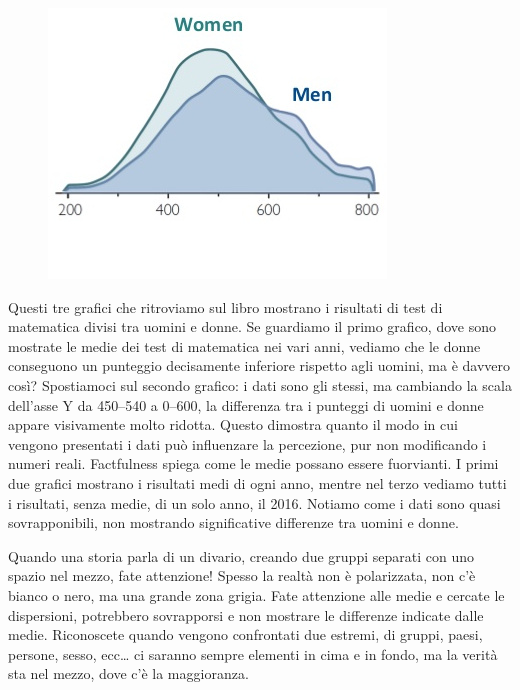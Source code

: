 \documentclass[12pt]{book} %
\begin{document}
\begin{figure}[H]
\begin{minipage}{0.3\textwidth}
    \end{minipage}
    \hfill
    \begin{minipage}{0.3\textwidth}
        \centering
        \includegraphics[width=\linewidth]{images/Libro-img004.jpg}
    \end{minipage}
\end{figure}

Questi tre grafici che ritroviamo sul libro mostrano i risultati di test di matematica divisi tra uomini e donne. Se
guardiamo il primo grafico, dove sono mostrate le medie dei test di matematica nei vari anni, vediamo che le donne
conseguono un punteggio decisamente inferiore rispetto agli uomini, ma è davvero così? Spostiamoci sul secondo grafico: i dati sono gli stessi, ma cambiando la scala dell’asse Y da 450–540 a 0–600, la differenza tra i punteggi di uomini e donne appare visivamente molto ridotta. Questo dimostra quanto il modo in cui vengono presentati i dati può influenzare la percezione, pur non modificando i numeri reali. Factfulness spiega come le medie possano essere fuorvianti. I primi due grafici mostrano i risultati medi di ogni
anno, mentre nel terzo vediamo tutti i risultati, senza medie, di un solo anno, il 2016. Notiamo come i dati sono quasi
sovrapponibili, non mostrando significative differenze tra uomini e donne.

Quando una storia parla di un divario, creando due gruppi separati con uno spazio nel mezzo, fate attenzione! Spesso la
realtà non è polarizzata, non c'è bianco o nero, ma una grande zona grigia. Fate attenzione alle
medie e cercate le dispersioni, potrebbero sovrapporsi e non mostrare le differenze indicate dalle medie. Riconoscete
quando vengono confrontati due estremi, di gruppi, paesi, persone, sesso, ecc… ci saranno sempre elementi in cima e in
fondo, ma la verità sta nel mezzo, dove c'è la maggioranza.
\end{document}
